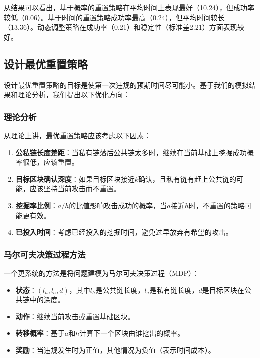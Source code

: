 \documentclass[12pt,a4paper]{article}
\begin{document}
\begin{CJK}{UTF8}{gbsn}
从结果可以看出，基于概率的重置策略在平均时间上表现最好（10.24），但成功率较低（0.06）。基于时间的重置策略成功率最高（0.24），但平均时间较长（13.36）。动态调整策略在成功率（0.21）和稳定性（标准差2.21）方面表现较好。

\subsection{设计最优重置策略}

设计最优重置策略的目标是使第一次违规的预期时间尽可能小。基于我们的模拟结果和理论分析，我们提出以下优化方向：

\subsubsection{理论分析}

从理论上讲，最优重置策略应该考虑以下因素：

\begin{enumerate}
    \item \textbf{公私链长度差距}：当私有链落后公共链太多时，继续在当前基础上挖掘成功概率很低，应该重置。
    \item \textbf{目标区块确认深度}：如果目标区块接近$k$确认，且私有链有赶上公共链的可能，应该坚持当前攻击而不重置。
    \item \textbf{挖掘率比例}：$a/h$的比值影响攻击成功的概率，当$a$接近$h$时，不重置的策略可能更有效。
    \item \textbf{已投入时间}：考虑已经投入的挖掘时间，避免过早放弃有希望的攻击。
\end{enumerate}

\subsubsection{马尔可夫决策过程方法}

一个更系统的方法是将问题建模为马尔可夫决策过程（MDP）：

\begin{itemize}
    \item \textbf{状态}：$(l_h, l_a, d)$，其中$l_h$是公共链长度，$l_a$是私有链长度，$d$是目标区块在公共链中的深度。
    \item \textbf{动作}：继续当前攻击或重置基础区块。
    \item \textbf{转移概率}：基于$a$和$h$计算下一个区块由谁挖出的概率。
    \item \textbf{奖励}：当违规发生时为正值，其他情况为负值（表示时间成本）。
\end{itemize}


\end{CJK}
\end{document}
